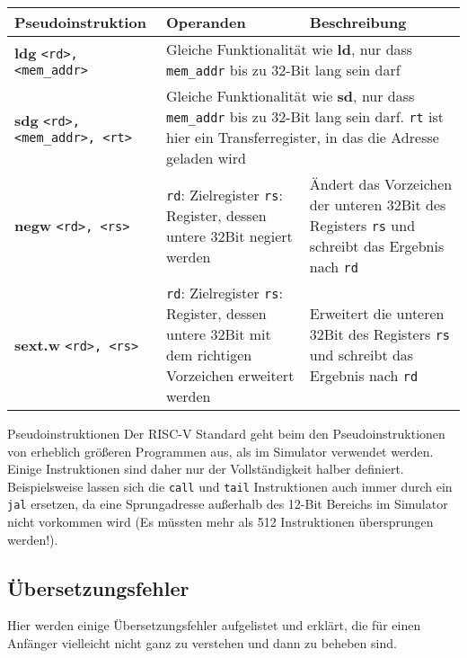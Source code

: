 \begin{tabular}{p{4.8cm} p{5.0cm} p{5.0cm}}

  \textbf{Pseudoinstruktion} & \textbf{Operanden} & \textbf{Beschreibung}\\
  \toprule

	\textbf{ldg} \texttt{<rd>, <mem\_addr>} &
	\multicolumn{2}{|p{10cm}|}{Gleiche Funktionalität wie \textbf{ld}, nur dass \texttt{mem\_addr} bis zu 32-Bit lang sein darf}\\



	\textbf{sdg} \texttt{<rd>, <mem\_addr>, <rt>} &
	\multicolumn{2}{|p{10cm}|}{Gleiche Funktionalität wie \textbf{sd}, nur dass \texttt{mem\_addr} bis zu 32-Bit lang sein darf. \texttt{rt} ist hier ein Transferregister, in das die Adresse geladen wird}\\



	\textbf{negw} \texttt{<rd>, <rs>} &
	\textbullet \texttt{rd}: Zielregister \newline
	\textbullet \texttt{rs}: Register, dessen untere 32Bit negiert werden
	& Ändert das Vorzeichen der unteren 32Bit des Registers \texttt{rs} und schreibt das Ergebnis nach \texttt{rd}\\



	\textbf{sext.w} \texttt{<rd>, <rs>} &
	\textbullet \texttt{rd}: Zielregister \newline
	\textbullet \texttt{rs}: Register, dessen untere 32Bit mit dem richtigen Vorzeichen erweitert werden
	& Erweitert die unteren 32Bit des Registers \texttt{rs} und schreibt das Ergebnis nach \texttt{rd}\\


\end{tabular}

\begin{infoblock}{Pseudoinstruktionen}
	Der RISC-V Standard geht beim den Pseudoinstruktionen von erheblich größeren Programmen aus, als im Simulator verwendet werden. Einige Instruktionen sind daher nur der Vollständigkeit halber definiert. Beispielsweise lassen sich die \texttt{call} und \texttt{tail} Instruktionen auch immer durch ein \texttt{jal} ersetzen, da eine Sprungadresse außerhalb des 12-Bit Bereichs im Simulator nicht vorkommen wird (Es müssten mehr als 512 Instruktionen übersprungen werden!).
\end{infoblock}

\subsection{Übersetzungsfehler}
\label{user-manual-riscv-errors}
Hier werden einige Übersetzungsfehler aufgelistet und erklärt, die für einen Anfänger vielleicht nicht ganz zu verstehen und dann zu beheben sind.

